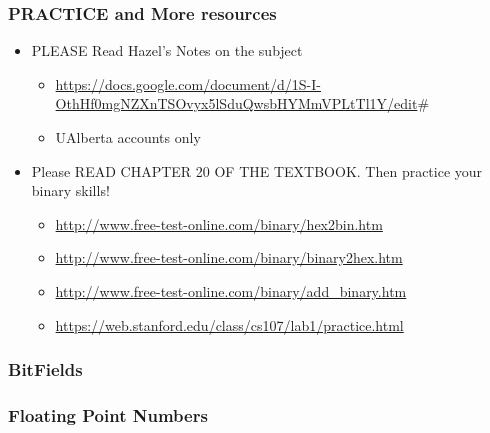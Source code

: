 \documentclass[11pt]{article}
\begin{document}
\subsubsection{PRACTICE and More resources}
\label{sec:orgf740d96}

\begin{itemize}
\item PLEASE Read Hazel's Notes on the subject 
\begin{itemize}
\item \url{https://docs.google.com/document/d/1S-I-OthHf0mgNZXnTSOvyx5lSduQwsbHYMmVPLtTl1Y/edit}\#
\item UAlberta accounts only
\end{itemize}

\item Please READ CHAPTER 20 OF THE TEXTBOOK. Then practice your binary skills!
\begin{itemize}
\item \url{http://www.free-test-online.com/binary/hex2bin.htm}
\item \url{http://www.free-test-online.com/binary/binary2hex.htm}
\item \url{http://www.free-test-online.com/binary/add\_binary.htm}
\item \url{https://web.stanford.edu/class/cs107/lab1/practice.html}
\end{itemize}
\end{itemize}


\subsubsection{BitFields}
\label{sec:org4e71299}



\subsubsection{Floating Point Numbers}
\label{sec:orge3daaa3}
\end{document}
